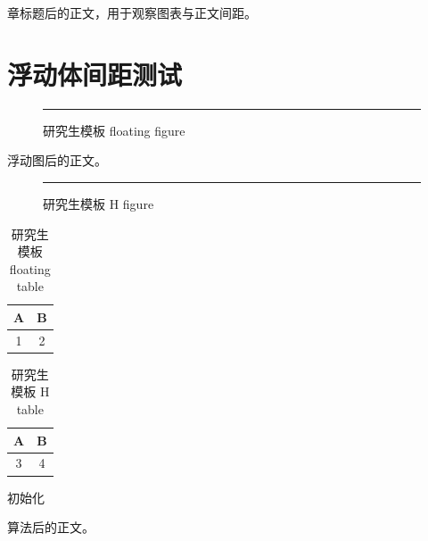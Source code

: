 \documentclass[type=doctor]{bithesis}
\begin{document}
\frontmatter
\mainmatter

章标题后的正文，用于观察图表与正文间距。

\section{浮动体间距测试}

\begin{figure}[hbt]
  \centering
  \rule{0.6\textwidth}{0.2\textwidth}
  \caption{研究生模板 floating figure}
\end{figure}

浮动图后的正文。

\begin{figure}[H]
  \centering
  \rule{0.6\textwidth}{0.2\textwidth}
  \caption{研究生模板 H figure}
\end{figure}

\begin{table}[hbt]
  \centering
  \caption{研究生模板 floating table}
  \begin{tabular}{cc}
    \toprule
    A & B \\
    \midrule
    1 & 2 \\
    \bottomrule
  \end{tabular}
\end{table}

\begin{table}[H]
  \centering
  \caption{研究生模板 H table}
  \begin{tabular}{cc}
    \toprule
    A & B \\
    \midrule
    3 & 4 \\
    \bottomrule
  \end{tabular}
\end{table}

\begin{algorithm}[H]
  \caption{研究生模板 algorithm spacing}
  初始化\;
\end{algorithm}

算法后的正文。
\end{document}
